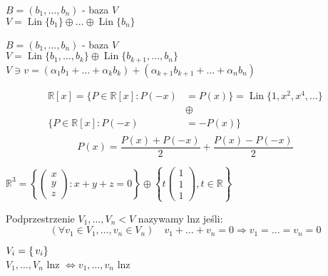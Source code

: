 \begin{prz} 
    $B = (b_1,\ldots,b_n)$ - baza $V$ \\ 
    $V = \operatorname{Lin}\{b_1\} \oplus \ldots \oplus \operatorname{Lin}\{b_n\}$
\end{prz}
\begin{prz} 
    $B = (b_1,\ldots,b_n)$ - baza $V$ \\ 
    $V = \operatorname{Lin}\{b_1,\ldots,b_k\} \oplus \operatorname{Lin}\{b_{k+1},\ldots,b_n\}$ \\ 
    $V \ni v = (\alpha_1 b_1 + \ldots + \alpha_k b_k) + (\alpha_{k+1} b_{k+1} + \ldots + \alpha_n b_n)$ 
\end{prz} 
\begin{prz} 
    \begin{align*}
        \mathbb{R}[x] = \{ P \in \mathbb{R}[x] : P(-x) &= P(x) \} = \operatorname{Lin}\{1,x^2,x^4,\ldots\} \\ 
        &\oplus \\ 
        \{ P \in \mathbb{R}[x] : P(-x) &= -P(x) \}  \\ 
    \end{align*}
    \[P(x) = \frac{P(x)+P(-x)}{2} + \frac{P(x) - P(-x)}{2} \]
\end{prz}
\begin{prz} 
    $\mathbb{R}^3 = \left\{ \begin{pmatrix} x \\ y \\ z \end{pmatrix}: x + y + z = 0 \right\} \oplus 
    \left\{ t \begin{pmatrix} 1 \\ 1 \\ 1 \end{pmatrix}, t \in \mathbb{R} \right\} $
\end{prz}
\begin{df} 
    Podprzestrzenie $V_1,\ldots,V_n < V$ nazywamy lnz jeśli: 
    \[ (\forall v_1 \in V_1,\ldots,v_n \in V_n) \quad v_1 + \ldots +v_n = 0 \Rightarrow v_1 = \ldots = v_n = 0 \]
\end{df} 
\begin{prz} 
    $V_i = \operatorname\{v_i\}$ \\ 
    $V_1,\ldots,V_n$ lnz $\Leftrightarrow v_1,\ldots,v_n$ lnz 
\end{prz}

